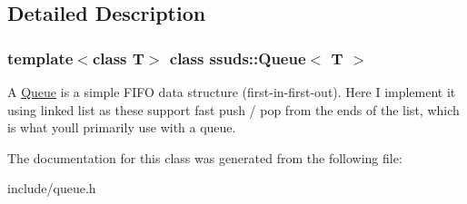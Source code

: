\subsection{Detailed Description}
\subsubsection*{template$<$class T$>$\newline
class ssuds\+::\+Queue$<$ T $>$}

A \mbox{\hyperlink{classssuds_1_1_queue}{Queue}} is a simple F\+I\+FO data structure (first-\/in-\/first-\/out). Here I implement it using linked list as these support fast push / pop from the ends of the list, which is what you\textquotesingle{}ll primarily use with a queue. 

The documentation for this class was generated from the following file\+:\begin{DoxyCompactItemize}
\item 
include/queue.\+h\end{DoxyCompactItemize}
